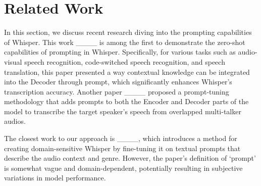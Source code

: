 \section{Related Work}
In this section, we discuss recent research diving into the prompting capabilities of Whisper. 
This work ____ is among the first to demonstrate the zero-shot capabilities of prompting in Whisper. Specifically, for various tasks such as audio-visual speech recognition, code-switched speech recognition, and speech translation, this paper presented a way contextual knowledge can be integrated into the Decoder through prompt, which significantly enhances Whisper's transcription accuracy. Another paper ____ proposed a prompt-tuning methodology that adds prompts to both the Encoder and Decoder parts of the model to transcribe the target speaker's speech from overlapped multi-talker audios.

The closest work to our approach is ____, which introduces a method for creating domain-sensitive Whisper by fine-tuning it on textual prompts that describe the audio context and genre. However, the paper's definition of `prompt' is somewhat vague and domain-dependent, potentially resulting in subjective variations in model performance.

